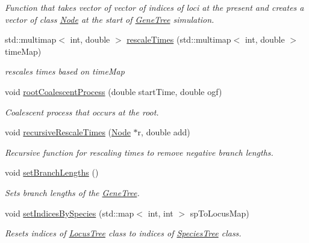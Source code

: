 \begin{DoxyCompactItemize}
\begin{DoxyCompactList}\small\item\em Function that takes vector of vector of indices of loci at the present and creates a vector of class \mbox{\hyperlink{class_node}{Node}} at the start of \mbox{\hyperlink{class_gene_tree}{Gene\+Tree}} simulation. \end{DoxyCompactList}\item 
std\+::multimap$<$ int, double $>$ \mbox{\hyperlink{class_gene_tree_a6549561e4582a7a28a6b68c895c302e7}{rescale\+Times}} (std\+::multimap$<$ int, double $>$ time\+Map)
\begin{DoxyCompactList}\small\item\em rescales times based on time\+Map \end{DoxyCompactList}\item 
void \mbox{\hyperlink{class_gene_tree_a0eac2f81800a4aa6734dd1d9ef329614}{root\+Coalescent\+Process}} (double start\+Time, double ogf)
\begin{DoxyCompactList}\small\item\em Coalescent process that occurs at the root. \end{DoxyCompactList}\item 
void \mbox{\hyperlink{class_gene_tree_a3f9736710802274e64f167ff984d42ca}{recursive\+Rescale\+Times}} (\mbox{\hyperlink{class_node}{Node}} $\ast$r, double add)
\begin{DoxyCompactList}\small\item\em Recursive function for rescaling times to remove negative branch lengths. \end{DoxyCompactList}\item 
void \mbox{\hyperlink{class_gene_tree_a3c0dbf4e22df508a00bb814c68f7fe54}{set\+Branch\+Lengths}} ()
\begin{DoxyCompactList}\small\item\em Sets branch lengths of the \mbox{\hyperlink{class_gene_tree}{Gene\+Tree}}. \end{DoxyCompactList}\item 
void \mbox{\hyperlink{class_gene_tree_afa604551a08482b11d50f4cd65a96a2f}{set\+Indices\+By\+Species}} (std\+::map$<$ int, int $>$ sp\+To\+Locus\+Map)
\begin{DoxyCompactList}\small\item\em Resets indices of \mbox{\hyperlink{class_locus_tree}{Locus\+Tree}} class to indices of \mbox{\hyperlink{class_species_tree}{Species\+Tree}} class. \end{DoxyCompactList}\item 

\end{DoxyCompactItemize}
